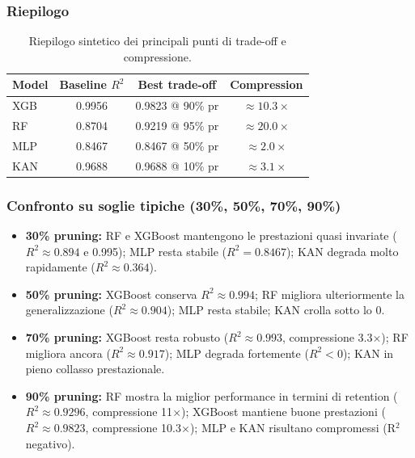 \documentclass[a4paper,12pt]{report}
\begin{document}
	\subsubsection{Riepilogo}
	\begin{table}[H]
		\centering
		\begin{tabular}{lccc}
			\toprule
			\textbf{Model} & \textbf{Baseline \(R^2\)} & \textbf{Best trade-off} & \textbf{Compression} \\
			\midrule
			XGB           & 0.9956 & 0.9823 @ 90\% pr & \(\approx 10.3\times\) \\
			RF            & 0.8704 & 0.9219 @ 95\% pr & \(\approx 20.0\times\) \\
			MLP           & 0.8467 & 0.8467 @ 50\% pr & \(\approx 2.0\times\) \\
			KAN           & 0.9688 & 0.9688 @ 10\% pr & \(\approx 3.1\times\) \\
			\bottomrule
		\end{tabular}
		\caption{Riepilogo sintetico dei principali punti di trade-off e compressione.}
	\end{table}
	
	\subsubsection{Confronto su soglie tipiche (30\%, 50\%, 70\%, 90\%)}
	\begin{itemize}
		\item \textbf{30\% pruning:} RF e XGBoost mantengono le prestazioni quasi invariate (\(R^2 \approx 0.894\) e 0.995); MLP resta stabile (\(R^2 = 0.8467\)); KAN degrada molto rapidamente (\(R^2 \approx 0.364\)).
		\item \textbf{50\% pruning:} XGBoost conserva \(R^2 \approx 0.994\); RF migliora ulteriormente la generalizzazione (\(R^2 \approx 0.904\)); MLP resta stabile; KAN crolla sotto lo 0.
		\item \textbf{70\% pruning:} XGBoost resta robusto (\(R^2 \approx 0.993\), compressione 3.3$\times$); RF migliora ancora (\(R^2 \approx 0.917\)); MLP degrada fortemente (\(R^2 < 0\)); KAN in pieno collasso prestazionale.
		\item \textbf{90\% pruning:} RF mostra la miglior performance in termini di retention (\(R^2 \approx 0.9296\), compressione 11$\times$); XGBoost mantiene buone prestazioni (\(R^2 \approx 0.9823\), compressione 10.3$\times$); MLP e KAN risultano compromessi (R\(^2\) negativo).
	\end{itemize}
	
\end{document}
